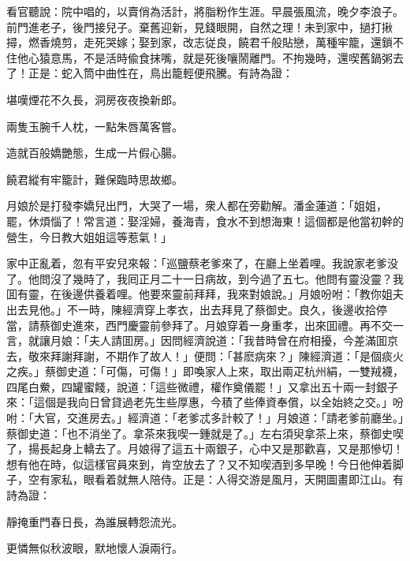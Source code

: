 看官聽說：院中唱的，以賣俏為活計，將脂粉作生涯。早晨張風流，晚夕李浪子。前門進老子，後門接兒子。棄舊迎新，見錢眼開，自然之理！未到家中，撾打揪撏，燃香燒剪，走死哭嫁；娶到家，改志従良，饒君千般貼戀，萬種牢籠，還鎖不住他心猿意馬，不是活時偸食抹嘴，就是死後嚷鬧離門。不拘幾時，還喫舊鍋粥去了！正是：蛇入筒中曲性在，鳥出籠輕便飛騰。有詩為證：

\begin{myquote}
堪嘆煙花不久長，洞房夜夜換新郎。

兩隻玉腕千人枕，一點朱唇萬客嘗。

造就百般嬌艷態，生成一片假心腸。

饒君縱有牢籠計，難保臨時思故鄉。
\end{myquote}

月娘於是打發李嬌兒出門，大哭了一場，衆人都在旁勸解。潘金蓮道：「姐姐，罷，休煩惱了！常言道：娶淫婦，養海青，食水不到想海東！這個都是他當初幹的營生，今日教大姐姐這等惹氣！」

家中正亂着，忽有平安兒來報：「巡鹽蔡老爹來了，在廳上坐着哩。我說家老爹没了。他問沒了幾時了，我囘正月二十一日病故，到今過了五七。他問有靈没靈？我囬有靈，在後邊供養着哩。他要來靈前拜拜，我來對娘說。」月娘吩咐：「教你姐夫出去見他。」不一時，陳經濟穿上孝衣，出去拜見了蔡御史。良久，後邊收拾停當，請蔡御史進來，西門慶靈前參拜了。月娘穿着一身重孝，出來囬禮。再不交一言，就讓月娘：「夫人請囬房。」因問經濟說道：「我昔時曾在府相擾，今差滿囬京去，敬來拜謝拜謝，不期作了故人！」便問：「甚麽病來？」陳經濟道：「是個痰火之疾。」蔡御史道：「可傷，可傷！」即喚家人上來，取出兩疋杭州絹，一雙羢襪，四尾白鮝，四罐蜜餞，說道：「這些微禮，權作奠儀罷！」又拿出五十兩一封銀子來：「這個是我向日曾貸過老先生些厚惠，今積了些俸資奉償，以全始終之交。」吩咐：「大官，交進房去。」經濟道：「老爹忒多計較了！」月娘道：「請老爹前廳坐。」蔡御史道：「也不消坐了。拿茶來我喫一鍾就是了。」左右須臾拿茶上來，蔡御史喫了，揚長起身上轎去了。月娘得了這五十兩銀子，心中又是那歡喜，又是那慘切！想有他在時，似這樣官員來到，肯空放去了？又不知喫酒到多早晚！今日他伸着脚子，空有家私，眼看着就無人陪侍。正是：人得交游是風月，天開圖畫即江山。有詩為證：

\begin{myquote}
靜掩重門春日長，為誰展轉怨流光。

更憐無似秋波眼，默地懷人淚兩行。
\end{myquote}

